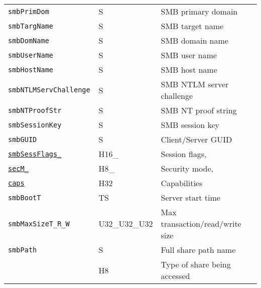 \documentclass[documentation]{subfiles}
\begin{document}
\begin{longtable}{>{\tt}lll>{\tt\small}l}
    smbPrimDom                                      & S             & SMB primary domain                         & \\
    smbTargName                                     & S             & SMB target name                            & \\
    smbDomName                                      & S             & SMB domain name                            & \\
    smbUserName                                     & S             & SMB user name                              & \\
    smbHostName                                     & S             & SMB host name                              & \\
    smbNTLMServChallenge                            & S             & SMB NTLM server challenge                  & \\
    smbNTProofStr                                   & S             & SMB NT proof string                        & \\
    smbSessionKey                                   & S             & SMB session key                            & \\
    smbGUID                                         & S             & Client/Server GUID                         & \\
    \hyperref[smbSessFlagsSecMCaps]{smbSessFlags\_} & H16\_         & Session flags,                             & \\
    \qquad\hyperref[smbSessFlagsSecMCaps]{secM\_}   & \qquad H8\_   & \qquad Security mode,                      & \\
    \qquad\hyperref[smbSessFlagsSecMCaps]{caps}     & \qquad H32    & \qquad Capabilities                        & \\
    smbBootT                                        & TS            & Server start time                          & \\
    smbMaxSizeT\_R\_W                               & U32\_U32\_U32 & Max transaction/read/write size            & \\
    smbPath                                         & S             & Full share path name                       & \\
    \nameref{smbShareT}                             & H8            & Type of share being accessed               & \\

\end{longtable}
\end{document}

